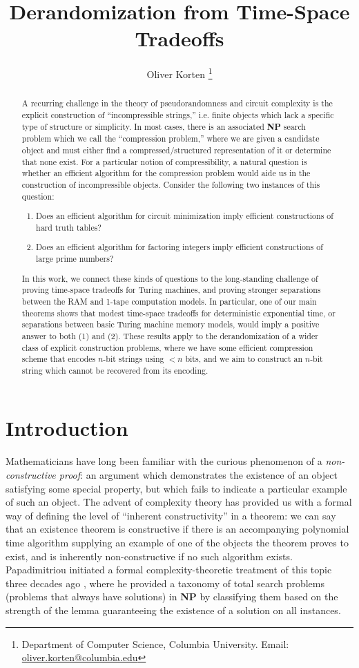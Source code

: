 \documentclass[11pt]{article}
\author{Oliver Korten \thanks{Department of Computer Science, Columbia University. Email: \href{mailto:oliver.korten@columbia.edu}{oliver.korten@columbia.edu}}}
\date{}
\title{Derandomization from Time-Space Tradeoffs}
\def\cl{\bf}
\begin{document}
\maketitle
\begin{abstract}
A recurring challenge in the theory of pseudorandomness and circuit complexity is the explicit construction of ``incompressible strings,'' i.e. finite objects which lack a specific type of structure or simplicity. In most cases, there is an associated {\cl NP} search problem which we call the ``compression problem,'' where we are given a candidate object and must either find a compressed/structured representation of it or determine that none exist. For a particular notion of compressibility, a natural question is whether an efficient algorithm for the compression problem would aide us in the construction of incompressible objects. Consider the following two instances of this question:
\begin{enumerate}
    \item Does an efficient algorithm for circuit minimization imply efficient constructions of hard truth tables?
    \item Does an efficient algorithm for factoring integers imply efficient constructions of large prime numbers?
\end{enumerate} 
In this work, we connect these kinds of questions to the long-standing challenge of proving time-space tradeoffs for Turing machines, and proving stronger separations between the RAM and 1-tape computation models. In particular, one of our main theorems shows that modest time-space tradeoffs for deterministic exponential time, or separations between basic Turing machine memory models, would imply a positive answer to both (1) and (2). 
These results apply to the derandomization of a wider class of explicit construction problems, where we have some efficient compression scheme that encodes $n$-bit strings using $<n$ bits, and we aim to construct an $n$-bit string which cannot be recovered from its encoding.
\end{abstract}
\newpage
\section{Introduction}\label{sec:intro}
Mathematicians have long been familiar with the curious phenomenon of a \emph{non-constructive proof}: an argument which demonstrates the existence of an object satisfying some special property, but which fails to indicate a particular example of such an object.
The advent of complexity theory has provided us with a formal way of defining the level of ``inherent constructivity'' in a theorem: we can say that an existence theorem is constructive if there is an accompanying polynomial time algorithm supplying an example of one of the objects the theorem proves to exist, and is inherently non-constructive if no such algorithm exists. Papadimitriou initiated a formal complexity-theoretic treatment of this topic three decades ago \cite{christos}, where he provided a taxonomy of total search problems (problems that always have solutions) in {\cl NP} by classifying them based on the strength of the lemma guaranteeing the existence of a solution on all instances.
\end{document}
